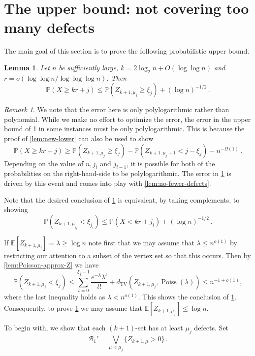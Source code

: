 \documentclass[11pt]{article}
\newtheorem{lemma}[theorem]{Lemma}
\theoremstyle{definition}
\theoremstyle{remark}
\newtheorem{remark}[theorem]{Remark}
\newcommand{\Poiss}{\operatorname{Poiss}}
\newcommand{\TV}{\mathrm{TV}}
\newcommand{\E}{\mathbb{E}}
\newcommand{\PP}{\mathbb{P}}
\newcommand{\cB}{\mathcal{B}}
\begin{document}
\section{The upper bound: not covering too many defects}

The main goal of this section is to prove the following probabilistic upper bound.

\begin{lemma}\label{lem:new-upper}
    Let $n$ be sufficiently large, $k = 2 \log_2 n + O( \log \log n)$ and $ r = o(\log\log n / \log\log\log n)$.     Then $$\PP(X \geq kr + j) \leq \PP(Z_{k+1,\mu_{j}} \geq \xi_{j}) + (\log n)^{-1/2}\,.$$
\end{lemma}

\begin{remark}
    We note that the error here is only polylogarithmic rather than polynomial.  While we make no effort to optimize the error, the error in the upper bound of \cref{lem:new-upper} in some instances must be only polylogarithmic.  This is because  the proof of \cref{lem:new-lower} can also be used to show $$\PP(X \geq kr + j) \geq \PP(Z_{k+1,\mu_{j}} \geq \xi_j) - \PP(Z_{k+1,\mu_{j} +1} < j - \xi_j ) - n^{-\Omega(1)}\,.$$
    Depending on the value of $n,j_i$ and $j_{i-1}$, it is possible for both of the probabilities on the right-hand-side to be polylogarithmic.  The error in \cref{lem:new-upper} is driven by this event and comes into play with \cref{lem:no-fewer-defects}.
 
\end{remark}

Note that the desired conclusion of \cref{lem:new-upper} is equivalent, by taking complements,  to showing $$\PP(Z_{k+1,\mu_{j_i}} < \xi_{j_i}) \leq \PP(X < kr + j_i) + (\log n)^{-1/2}\,.$$


If $\E[Z_{k+1,\mu_{j}}] =\lambda \geq \log n$ note first that we may assume that $\lambda \leq n^{o(1)}$ by restricting our attention to a subset of the vertex set so that this occurs. Then by \cref{lem:Poisson-approx-Z} we have
$$\PP(Z_{k+1,\mu_{j}} < \xi_j)\le\sum_{t=0}^{\xi_j-1}\frac{e^{-\lambda} \lambda^t}{t!}+d_{\TV}(Z_{k+1, \mu_{j}}, \Poiss(\lambda)) \leq n^{-1 + o(1)},$$
where the last inequality holds as $\lambda < n^{o(1)}$. This shows the conclusion of \cref{lem:new-upper}. Consequently, to prove \cref{lem:new-upper} we may assume that $\E[Z_{k+1,\mu_{j}}] \leq \log n$.

To begin with, we show that 
each $(k+1)$-set has at least $\mu_{j} $ defects.  Set 
\begin{equation} \label{eq:fewer-than-mu-defects}
    \cB_1' = \bigvee_{\mu < \mu_{j}}\{ Z_{k+1,\mu} > 0\}\,.
\end{equation}
\end{document}
